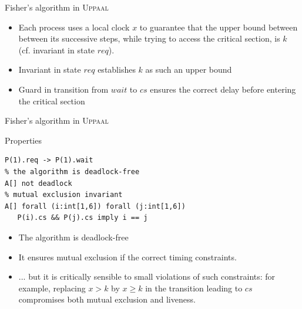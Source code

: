 \documentclass[aspectratio=169]{beamer}
\begin{document}
\begin{slide}{Fisher's algorithm in \textsc{Uppaal}}
\small
\centering



\begin{itemize}
\item Each process uses a local clock $x$ to guarantee that the upper bound between between its successive steps, while
trying to access the critical section, is $k$ (cf. \alert{invariant} in state $req$).
\item \alert{Invariant} in state $req$ establishes $k$ as such an upper bound
\item \alert{Guard} in transition from $wait$ to $cs$ ensures the correct delay before entering the critical section
\end{itemize}
\end{slide}

\begin{frame}[fragile]{Fisher's algorithm in \textsc{Uppaal}}
\small

\begin{block}{Properties}
\begin{lstlisting}[emph={[2]forall,not}]
% P(1) requests access => it will eventually wait
P(1).req -> P(1).wait
% the algorithm is deadlock-free
A[] not deadlock
% mutual exclusion invariant
A[] forall (i:int[1,6]) forall (j:int[1,6])
   P(i).cs && P(j).cs imply i == j  
\end{lstlisting}
\end{block}

\begin{itemize}
\item The algorithm is \alert{deadlock-free}
\item It ensures  mutual exclusion if the correct timing constraints. 
\item ... but it is critically sensible to  small violations of such constraints: for example, replacing $x > k$ by 
$x \geq k$ in the transition leading to $cs$ compromises both \alert{mutual exclusion} and \alert{liveness}.
\end{itemize}
\end{frame}
\end{document}

